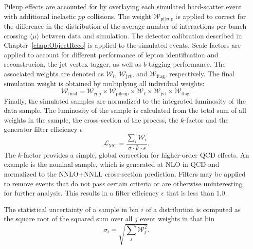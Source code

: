Pileup effects are accounted for by overlaying each simulated hard-scatter event with additional inelastic $pp$ collisions.
The weight $\mathcal{W}_\text{pileup}$ is applied to correct for the difference in the distribution of the average
number of interactions per bunch crossing $\langle\mu\rangle$ between data and simulation.
The detector calibration described in Chapter~\ref{chap:ObjectReco} is applied to the simulated events.
Scale factors are applied to account for different performance of lepton identification and reconstrucion,
the jet vertex tagger, as well as $b$ tagging performance.
The associated weights are denoted as $\mathcal{W}_l$, $\mathcal{W}_\text{jvt}$, and $\mathcal{W}_\text{ftag}$, respectively.
The final simulation weight is obtained by multiplying all individual weights:
 \begin{equation}
    \mathcal{W}_\text{final} = \mathcal{W}_\text{gen} \times \mathcal{W}_\text{pileup} \times \mathcal{W}_\ell
     \times \mathcal{W}_\text{jvt} \times \mathcal{W}_\text{ftag}.
\end{equation}
Finally, the simulated samples are normalized to the integrated luminosity of the data sample.
The luminosity of the sample is calculated from the total sum of all weights in the sample, the cross-section of the process,
the $k$-factor and the generator filter efficiency $\epsilon$
\begin{equation}
    \mathcal{L}_\text{MC} = \frac{\sum_i \mathcal{W}_i}{\sigma \cdot k \cdot \epsilon}.
\end{equation}
The $k$-factor provides a simple, global correction for higher-order QCD effects.
An example is the nominal \ttbar sample, which is generated at NLO in QCD and
normalized to the NNLO+NNLL cross-section prediction.
Filters may be applied to remove events that do not pass certain criteria or are
otherwise uninteresting for further analysis. 
This results in a filter efficiency $\epsilon$ that is less than 1.0.

The statistical uncertainty of a sample in bin $i$ of a distribution 
is computed as the square root of the squared sum over all $j$ event weights in that bin
\begin{equation}
    \sigma_i = \sqrt{\sum_j \mathcal{W}_j^2}.
\end{equation}